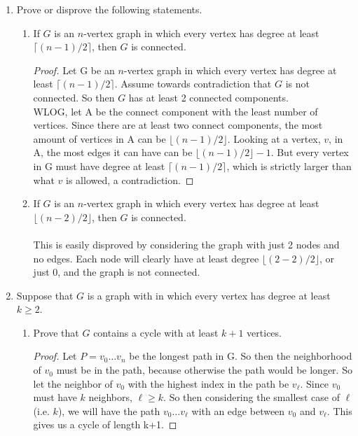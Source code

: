 \documentclass[12pt]{article}
\begin{document}
\begin{enumerate}
\medskip


\item Prove or disprove the following statements.
\begin{enumerate}
\item If $G$ is an $n$-vertex graph in which every vertex has degree at least $\lceil (n-1)/2 \rceil$, then $G$ is connected.
\begin{proof}
	Let G be an $n$-vertex graph in which every vertex has degree at least $\lceil (n-1)/2 \rceil$. Assume towards contradiction that $G$ is not connected. So then $G$ has at least 2 connected components.\\
	WLOG, let A be the connect component with the least number of vertices. Since there are at least two connect components, the most amount of vertices in A can be $\lfloor (n-1)/2 \rfloor$. Looking at a vertex, $v$, in A, the most edges it can have can be $\lfloor (n-1)/2 \rfloor-1$. But every vertex in G must have degree at least $\lceil (n-1)/2 \rceil$, which is strictly larger than what $v$ is allowed, a contradiction.
\end{proof}

\item If $G$ is an $n$-vertex graph in which every vertex has degree at least $\lfloor (n-2)/2 \rfloor$, then $G$ is connected.\\\\
This is easily disproved by considering the graph with just 2 nodes and no edges. Each node will clearly have at least degree $\lfloor (2-2)/2 \rfloor$, or just 0, and the graph is not connected.
\end{enumerate}

\medskip 

\item Suppose that $G$ is a graph with in which every vertex has degree at least $k \geq 2$. 
\begin{enumerate}
\item Prove that $G$ contains a cycle with at least $k+1$ vertices.\\
\begin{proof}
	Let $P=v_0\ldots v_n$ be the longest path in G. So then the neighborhood of $v_0$ must be in the path, because otherwise the path would be longer. So let the neighbor of $v_0$ with the highest index in the path be $v_\ell$. Since $v_0$ must have $k$ neighbors, $\ell\geq k$. So then considering the smallest case of $\ell$ (i.e. $k$), we will have the path $v_0\ldots v_\ell$ with an edge between $v_0$ and $v_\ell$. This gives us a cycle of length k+1.
\end{proof}



\end{enumerate}
\end{enumerate}
\end{document}
